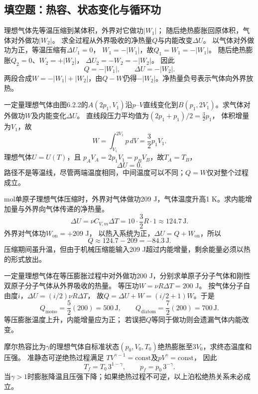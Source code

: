\subsection{填空题：热容、状态变化与循环功}

\problemtext 理想气体先等温压缩到某体积，外界对它做功$|W_1|$；
随后绝热膨胀回原体积，气体对外做功$|W_2|$。
求全过程从外界吸收的净热量$Q$与内能改变$\Delta U$。
\workings
以气体对外做功为正，等温压缩有$\Delta U_1=0$，
$W_1=-|W_1|$，故$Q_1=W_1=-|W_1|$。
随后绝热膨胀$Q_2=0$、$W_2=+|W_2|$，
$\Delta U_2=-W_2=-|W_2|$。
因此
\[
\boxed{Q=-|W_1|},\qquad
\boxed{\Delta U=-|W_2|}.
\]
\crosscheck 两段合成$W=-|W_1|+|W_2|$，由$Q-W$仍得$-|W_2|$。净热量负号表示气体向外界放热。

\problemtext 一定量理想气体由图6.2.2的$A(2p_1,V_1)$沿$p$--$V$直线变化到$B(p_1,2V_1)$。求气体对外做功$W$及内能变化$\Delta U$。
\workings
直线段压力平均值为$(2p_1+p_1)/2=\tfrac32p_1$，
体积增量为$V_1$，故
\[
\boxed{W=\int_{V_1}^{2V_1}p\,dV=\frac32p_1V_1}.
\]
理想气体$U=U(T)$，且
$p_AV_A=2p_1V_1=p_BV_B$，故$T_A=T_B$，
\[
\boxed{\Delta U=0}.
\]
\crosscheck 路径不是等温线，尽管两端温度相同，中间温度可以不同；$Q=W$仅对整个过程成立。

 mol单原子理想气体压缩时，外界对气体做功209 J，气体温度升高1 K。求内能增加量与外界向气体传递的净热量。
\workings
\[
\boxed{\Delta U=\nu C_{V,m}\Delta T
=10\cdot\frac32R\cdot1\approx124.7\,\mathrm J}.
\]
外界对气体功$W_{\mathrm{on}}=+209$ J，
以热入系统为正，$\Delta U=Q+W_{\mathrm{on}}$，所以
\[
\boxed{Q\approx124.7-209=-84.3\,\mathrm J}.
\]
\crosscheck 压缩期间虽升温，但由于机械压缩能输入209 J超过内能增量，剩余能量必须以热的形式放出。

\problemtext 一定量理想气体在等压膨胀过程中对外做功200 J，分别求单原子分子气体和刚性双原子分子气体从外界吸收的热量。
\workings
等压功$W=\nu R\Delta T=200$ J。
按气体分子自由度$i$，$\Delta U=(i/2)\nu R\Delta T$，
故$Q=\Delta U+W=(i/2+1)W$。于是
\[
\boxed{Q_{\mathrm{mono}}=\frac52(200)=500\,\mathrm J},
\qquad
\boxed{Q_{\mathrm{diatom}}=\frac72(200)=700\,\mathrm J}.
\]
\crosscheck 等压膨胀温度上升，内能增量应为正；
若误把$Q$等同于做功则会遗漏气体内能改变。

\problemtext 摩尔热容比为$\gamma$的理想气体自标准状态$(p_0,V_0,T_0)$绝热膨胀至$3V_0$，求终态温度和压强。
\workings
准静态可逆绝热过程满足
$TV^{\gamma-1}=\mathrm{const}$及$pV^\gamma=\mathrm{const}$，
因此
\[
\boxed{T_f=T_0\,3^{1-\gamma}},\qquad
\boxed{p_f=p_0\,3^{-\gamma}}.
\]
\crosscheck 当$\gamma>1$时膨胀降温且压强下降；如果绝热过程不可逆，以上泊松绝热关系未必成立。


